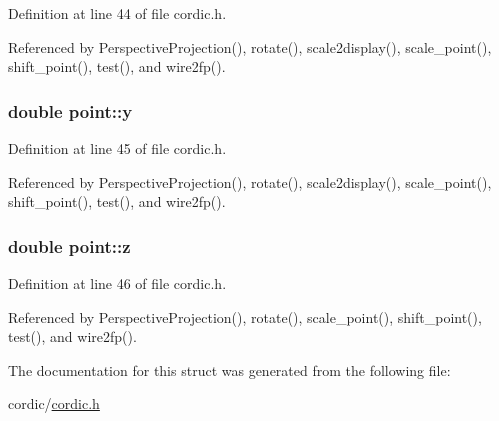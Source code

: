 Definition at line 44 of file cordic.\-h.



Referenced by Perspective\-Projection(), rotate(), scale2display(), scale\-\_\-point(), shift\-\_\-point(), test(), and wire2fp().

\hypertarget{structpoint_a613f8f0d7352731638b0094e1b958b87}{
\subsubsection[{y}]{\setlength{\rightskip}{0pt plus 5cm}double point\-::y}}\label{structpoint_a613f8f0d7352731638b0094e1b958b87}


Definition at line 45 of file cordic.\-h.



Referenced by Perspective\-Projection(), rotate(), scale2display(), scale\-\_\-point(), shift\-\_\-point(), test(), and wire2fp().

\hypertarget{structpoint_aab1f0c3682401083b5bf252e7001874f}{
\subsubsection[{z}]{\setlength{\rightskip}{0pt plus 5cm}double point\-::z}}\label{structpoint_aab1f0c3682401083b5bf252e7001874f}


Definition at line 46 of file cordic.\-h.



Referenced by Perspective\-Projection(), rotate(), scale\-\_\-point(), shift\-\_\-point(), test(), and wire2fp().



The documentation for this struct was generated from the following file\-:\begin{DoxyCompactItemize}
\item 
cordic/\hyperlink{cordic_8h}{cordic.\-h}\end{DoxyCompactItemize}
